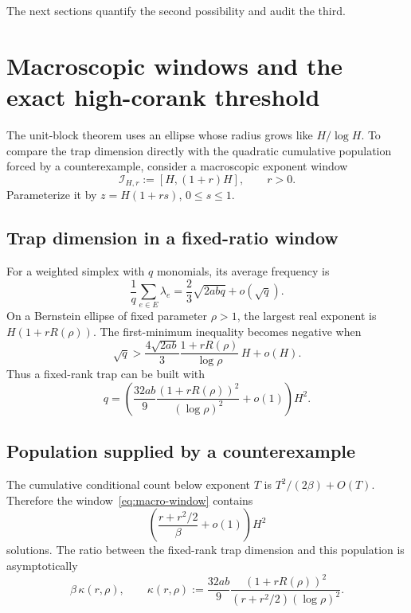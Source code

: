 \documentclass[11pt,oneside]{article}
\theoremstyle{definition}
\theoremstyle{remark}
\begin{document}
The next sections quantify the second possibility and audit the third.

\section{Macroscopic windows and the exact high-corank threshold}
\label{sec:window-optimization}

The unit-block theorem uses an ellipse whose radius grows like $H/\log H$.  To compare the
trap dimension directly with the quadratic cumulative population forced by a counterexample,
consider a macroscopic exponent window
\begin{equation}
 \mathcal I_{H,r}:=[H,(1+r)H],\qquad r>0.
 \label{eq:macro-window}
\end{equation}
Parameterize it by $z=H(1+rs)$, $0\le s\le1$.

\subsection{Trap dimension in a fixed-ratio window}

For a weighted simplex with $q$ monomials, its average frequency is
\begin{equation}
 \frac1q\sum_{e\in E}\lambda_e
 =\frac{2}{3}\sqrt{2abq}+o(\sqrt q).
 \label{eq:average-q}
\end{equation}
On a Bernstein ellipse of fixed parameter $\rho>1$, the largest real exponent is
$H(1+rR(\rho))$.  The first-minimum inequality becomes negative when
\begin{equation}
 \sqrt q>
 \frac{4\sqrt{2ab}}{3}
 \frac{1+rR(\rho)}{\log\rho}\,H+o(H).
 \label{eq:macro-q-threshold}
\end{equation}
Thus a fixed-rank trap can be built with
\begin{equation}
 q=\left(
 \frac{32ab}{9}\frac{(1+rR(\rho))^2}{(\log\rho)^2}+o(1)
 \right)H^2.
 \label{eq:macro-q}
\end{equation}

\subsection{Population supplied by a counterexample}

The cumulative conditional count below exponent $T$ is
$T^2/(2\beta)+O(T)$.  Therefore the window~\eqref{eq:macro-window} contains
\begin{equation}
 \left(\frac{r+r^2/2}{\beta}+o(1)\right)H^2
 \label{eq:macro-population}
\end{equation}
solutions.  The ratio between the fixed-rank trap dimension and this population is
asymptotically
\begin{equation}
 \beta\,\kappa(r,\rho),
 \qquad
 \kappa(r,\rho):=
 \frac{32ab}{9}
 \frac{(1+rR(\rho))^2}{(r+r^2/2)(\log\rho)^2}.
 \label{eq:kappa-r-rho}
\end{equation}
\end{document}
